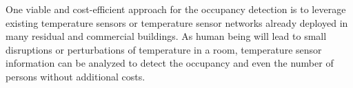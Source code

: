 One viable and cost-efficient  approach for the occupancy detection is to leverage
existing temperature sensors or temperature sensor networks already
deployed in many residual and commercial buildings. As human being
will lead to small disruptions or perturbations of temperature in a
room, temperature sensor information can be analyzed to detect the
occupancy and even the number of persons without additional costs.
